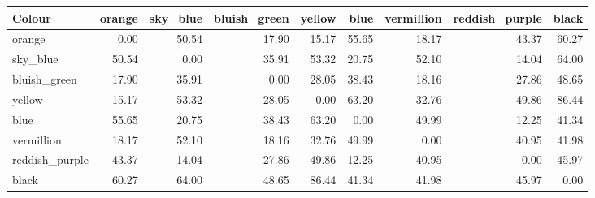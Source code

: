 \begin{tabular}{lrrrrrrrr}
\toprule
Colour & orange & sky\_blue & bluish\_green & yellow & blue & vermillion & reddish\_purple & black \\
\midrule
orange & 0.00 & 50.54 & 17.90 & 15.17 & 55.65 & 18.17 & 43.37 & 60.27 \\
sky\_blue & 50.54 & 0.00 & 35.91 & 53.32 & 20.75 & 52.10 & 14.04 & 64.00 \\
bluish\_green & 17.90 & 35.91 & 0.00 & 28.05 & 38.43 & 18.16 & 27.86 & 48.65 \\
yellow & 15.17 & 53.32 & 28.05 & 0.00 & 63.20 & 32.76 & 49.86 & 86.44 \\
blue & 55.65 & 20.75 & 38.43 & 63.20 & 0.00 & 49.99 & 12.25 & 41.34 \\
vermillion & 18.17 & 52.10 & 18.16 & 32.76 & 49.99 & 0.00 & 40.95 & 41.98 \\
reddish\_purple & 43.37 & 14.04 & 27.86 & 49.86 & 12.25 & 40.95 & 0.00 & 45.97 \\
black & 60.27 & 64.00 & 48.65 & 86.44 & 41.34 & 41.98 & 45.97 & 0.00 \\
\bottomrule
\end{tabular}
